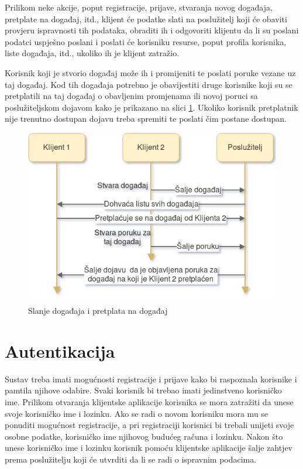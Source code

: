 \documentclass[times, utf8, zavrsni]{fer}
\begin{document}
{Prilikom neke akcije, poput registracije, prijave, stvaranja novog događaja, pretplate na događaj, itd., klijent će podatke slati na poslužitelj koji će obaviti provjeru ispravnosti tih podataka, obraditi ih i odgovoriti klijentu da li su poslani podatci uspješno poslani i poslati će korisniku resurse, poput profila korisnika, liste događaja, itd., ukoliko ih je klijent zatražio.

Korisnik koji je stvorio događaj može ih i promijeniti te poslati poruke vezane uz taj događaj. Kod tih događaja potrebno je obavijestiti druge korisnike koji su se pretplatili na taj događaj o obavljenim promjenama ili novoj poruci sa poslužiteljskom dojavom kako je prikazano na slici \ref{fig:event-subscription-image}. Ukoliko korisnik pretplatnik nije trenutno dostupan dojavu treba spremiti te poslati čim postane dostupan.

\begin{figure}[htb]
\centering
\includegraphics[width=12cm]{img/event-subscription.png}
\caption{Slanje događaja i pretplata na događaj}
\label{fig:event-subscription-image}
\end{figure}

\section{Autentikacija}
Sustav treba imati mogućnosti registracije i prijave kako bi raspoznala korisnike i pamtila njihove odabire. Svaki korisnik bi trebao imati jedinstveno korisničko ime. Prilikom otvaranja klijentske aplikacije korisnika se mora zatražiti da unese svoje korisničko ime i lozinku. Ako se radi o novom korisniku mora mu se ponuditi mogućnost registracije, a pri registraciji korisnici bi trebali unijeti svoje osobne podatke, korisničko ime njihovog budućeg računa i lozinku. Nakon što unese korisničko ime i lozinku korisnik pomoću klijentske aplikacije šalje zahtjev prema poslužitelju koji će utvrditi da li se radi o ispravnim podacima. 

}
\end{document}
